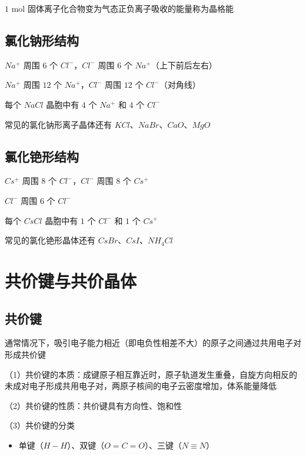 \documentclass[UTF8,zihao=-4,openany]{ctexbook}
\begin{document}
$1$ mol 固体离子化合物变为气态正负离子吸收的能量称为晶格能\par
\subsection{氯化钠形结构}
$Na^+$ 周围 $6$ 个 $Cl^-$，$Cl^-$ 周围 $6$ 个 $Na^+$（上下前后左右）\par

$Na^+$ 周围 $12$ 个 $Na^+$，$Cl^-$ 周围 $12$ 个 $Cl^-$（对角线）\par

每个 $NaCl$ 晶胞中有 $4$ 个 $Na^+$ 和 $4$ 个 $Cl^-$\par

常见的氯化钠形离子晶体还有 $KCl$、$NaBr$、$CaO$、$MgO$\par
\subsection{氯化铯形结构}
$Cs^+$ 周围 $8$ 个 $Cl^-$，$Cl^-$ 周围 $8$ 个 $Cs^+$\par

$Cl^-$ 周围 $6$ 个 $Cl^-$\par

每个 $CsCl$ 晶胞中有 $1$ 个 $Cl^-$ 和 $1$ 个 $Cs^+$\par

常见的氯化铯形晶体还有 $CsBr$、$CsI$、$NH_4Cl$\par
\section{共价键与共价晶体}
\subsection{共价键}
通常情况下，吸引电子能力相近（即电负性相差不大）的原子之间通过共用电子对形成共价键\par

（1）共价键的本质：成键原子相互靠近时，原子轨道发生重叠，自旋方向相反的未成对电子形成共用电子对，两原子核间的电子云密度增加，体系能量降低\par

（2）共价键的性质：共价键具有方向性、饱和性\par

（3）共价键的分类\par

\begin{itemize}
\item 单键（$H-H$）、双键（$O=C=O$）、三键（$N\equiv N$）
\end{itemize}
\end{document}
